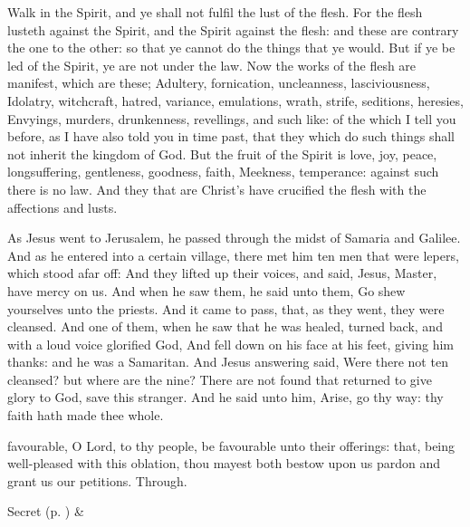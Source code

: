  Walk in the Spirit, and ye shall not fulfil the lust of the flesh. For the flesh lusteth against the Spirit, and the Spirit against the flesh: and these are contrary the one to the other: so that ye cannot do the things that ye would. But if ye be led of the Spirit, ye are not under the law. Now the works of the flesh are manifest, which are these; Adultery, fornication, uncleanness, lasciviousness, Idolatry, witchcraft, hatred, variance, emulations, wrath, strife, seditions, heresies, Envyings, murders, drunkenness, revellings, and such like: of the which I tell you before, as I have also told you in time past, that they which do such things shall not inherit the kingdom of God. But the fruit of the Spirit is love, joy, peace, longsuffering, gentleness, goodness, faith, Meekness, temperance: against such there is no law. And they that are Christ's have crucified the flesh with the affections and lusts.


 As Jesus went to Jerusalem, he passed through the midst of Samaria and Galilee. And as he entered into a certain village, there met him ten men that were lepers, which stood afar off: And they lifted up their voices, and said, Jesus, Master, have mercy on us. And when he saw them, he said unto them, Go shew yourselves unto the priests. And it came to pass, that, as they went, they were cleansed. And one of them, when he saw that he was healed, turned back, and with a loud voice glorified God, And fell down on his face at his feet, giving him thanks: and he was a Samaritan. And Jesus answering said, Were there not ten cleansed? but where are the nine? There are not found that returned to give glory to God, save this stranger. And he said unto him, Arise, go thy way: thy faith hath made thee whole.


\secret
{} favourable, O Lord, to thy people, be favourable unto their offerings: that, being well-pleased with this oblation, thou mayest both bestow upon us pardon and grant us our petitions. Through.
\begin{rubric}
     Secret  (p. \pageref{SPSaints}) \&  
\end{rubric}

